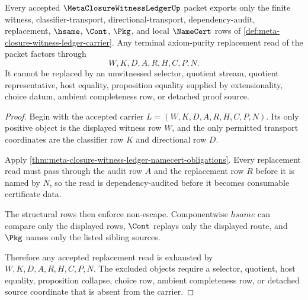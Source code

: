 \begin{theorem}
\label{thm:meta-closure-witness-ledger-nonescape}
Every accepted $\MetaClosureWitnessLedgerUp$ packet exports only the finite witness, classifier-transport, directional-transport, dependency-audit, replacement, $\hsame$, $\Cont$, $\Pkg$, and local $\NameCert$ rows of \autoref{def:meta-closure-witness-ledger-carrier}. Any terminal axiom-purity replacement read of the packet factors through
$$
W,K,D,A,R,H,C,P,N.
$$
It cannot be replaced by an unwitnessed selector, quotient stream, quotient representative, host equality, proposition equality supplied by extensionality, choice datum, ambient completeness row, or detached proof source.
\end{theorem}
\begin{proof}
Begin with the accepted carrier $L=(W,K,D,A,R,H,C,P,N)$. Its only positive object is the displayed witness row $W$, and the only permitted transport coordinates are the classifier row $K$ and directional row $D$.

Apply \autoref{thm:meta-closure-witness-ledger-namecert-obligations}. Every replacement read must pass through the audit row $A$ and the replacement row $R$ before it is named by $N$, so the read is dependency-audited before it becomes consumable certificate data.

The structural rows then enforce non-escape. Componentwise $hsame$ can compare only the displayed rows, $\Cont$ replays only the displayed route, and $\Pkg$ names only the listed sibling sources.

Therefore any accepted replacement read is exhausted by $W,K,D,A,R,H,C,P,N$. The excluded objects require a selector, quotient, host equality, proposition collapse, choice row, ambient completeness row, or detached source coordinate that is absent from the carrier.
\end{proof}



